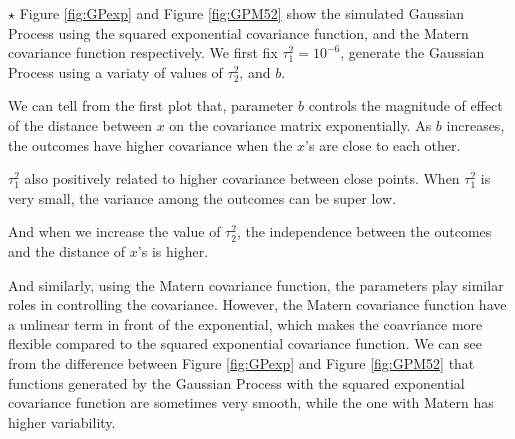 \documentclass[11pt]{article}
\newcommand{\jie}{$\star$ }
\begin{document}
\begin{enumerate}[(A)]
\bigskip \jie
Figure \ref{fig:GPexp} and Figure \ref{fig:GPM52} show the simulated Gaussian Process using 
the squared exponential covariance function, and the Matern covariance function respectively. We first fix $\tau_1^2 = 10^{-6}$, generate the Gaussian Process using a variaty of values of $\tau_2^2$, and $b$. 

We can tell from the first plot that, parameter $b$ controls the magnitude of effect of the distance between $x$ on the covariance matrix exponentially. As $b$ increases, the outcomes have higher covariance when the $x$'s are close to each other. 

$\tau_1^2$ also positively related to higher covariance between close points. When $\tau_1^2$ is very small, the variance among the outcomes can be super low. 

And when we increase the value of $\tau_2^2$, the independence between the outcomes and the distance of $x$'s is higher.

And similarly, using the Matern covariance function, the parameters play similar roles in controlling the covariance. However, the Matern covariance function have a unlinear term in front of the exponential, which makes the coavriance more flexible compared to the squared exponential covariance function. We can see from the difference between Figure \ref{fig:GPexp} and Figure \ref{fig:GPM52} that functions generated by the Gaussian Process with the squared exponential covariance function are sometimes very smooth, while the one with Matern has higher variability. 


\end{enumerate}
\end{document}
